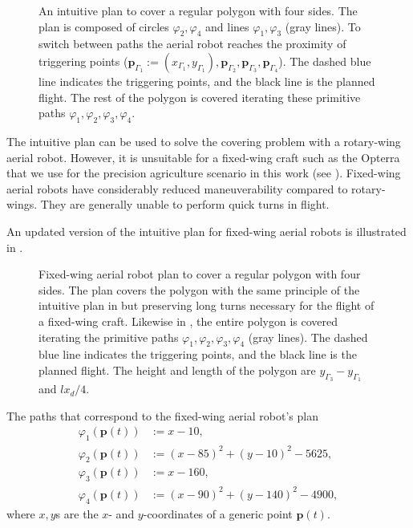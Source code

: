 \begin{figure}[t]
  \centering
  
  \caption[Intuitive plan to cover a regular polygon with four sides]{An intuitive plan to cover a regular polygon with four sides. The plan is composed of circles $\varphi_2,\varphi_4$ and lines $\varphi_1,\varphi_3$ (gray lines). To switch between paths the aerial robot reaches the proximity of triggering points ($\mathbf{p}_{\Gamma_1}:=(x_{\Gamma_1},y_{\Gamma_1}),\mathbf{p}_{\Gamma_2},\mathbf{p}_{\Gamma_3},\mathbf{p}_{\Gamma_4}$). The dashed blue line indicates the triggering points, and the black line is the planned flight. The rest of the polygon is covered iterating these primitive paths $\varphi_1,\varphi_2,\varphi_3,\varphi_4$.}
  \label{fig:plot3}
\end{figure}

The intuitive plan can be used to solve the covering problem with a rotary-wing aerial robot. However, it is unsuitable for a fixed-wing craft such as the Opterra that we use for the precision agriculture scenario in this work (see ). Fixed-wing aerial robots have considerably reduced maneuverability compared to rotary-wings. They are generally unable to perform quick turns in flight.

An updated version of the intuitive plan for fixed-wing aerial robots is illustrated in .

\begin{figure}[p!]
  \centering
  
  \caption[Fixed-wing aerial robot's plan to cover a regular polygon with four sides]{Fixed-wing aerial robot plan to cover a regular polygon with four sides. The plan covers the polygon with the same principle of the intuitive plan in  but preserving long turns necessary for the flight of a fixed-wing craft. Likewise in , the entire polygon is covered iterating the primitive paths $\varphi_1,\varphi_2,\varphi_3,\varphi_4$ (gray lines). The dashed blue line indicates the triggering points, and the black line is the planned flight. The height and length of the polygon are $y_{\Gamma_3}-y_{\Gamma_1}$ and $lx_d/4$.}
  \label{fig:plot4}
\end{figure}

The paths that correspond to the fixed-wing aerial robot's plan 
\begin{subequations}\label{eq:basic-plan}\begin{align}
\varphi_1(\mathbf{p}(t))&:=x-10,\label{eq:line1}\\
\varphi_2(\mathbf{p}(t))&:=(x-85)^2+(y-10)^2-5625,\label{eq:circ1}\\
\varphi_3(\mathbf{p}(t))&:=x-160,\label{eq:line2}\\
\varphi_4(\mathbf{p}(t))&:=(x-90)^2+(y-140)^2-4900,\label{eq:circ2}\end{align}
\end{subequations}
where $x,y$s are the $x$- and $y$-coordinates of a generic point $\mathbf{p}(t)$. 

